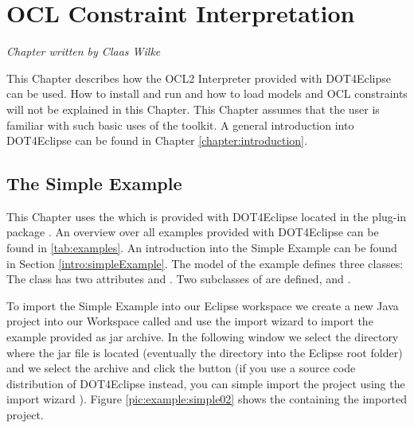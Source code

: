 \chapter{OCL Constraint Interpretation}
\label{chapter:interpretation}

\begin{flushright}
\textit{Chapter written by Claas Wilke}
\end{flushright}

This Chapter describes how the \acs{OCL}2 Interpreter provided with \acl{DOT4Eclipse} can be used. How to install and run  and how to load models and OCL constraints will not be explained in this Chapter. This Chapter assumes that the user is familiar with such basic uses of the toolkit. A general introduction into \acl{DOT4Eclipse} can be found in Chapter \ref{chapter:introduction}.




\section{The Simple Example}

This Chapter uses the  which is provided with \acl{DOT4Eclipse} located in the plug-in package . An overview over all examples provided with \acl{DOT4Eclipse} can be found in \ref{tab:examples}. An introduction into the Simple Example can be found in Section \ref{intro:simpleExample}. The model of the example defines three classes: The class  has two attributes  and . Two subclasses of  are defined,  and .

To import the Simple Example into our Eclipse workspace we create a new Java project into our Workspace called  and use the import wizard  to import the example provided as jar archive. In the following window we select the directory where the jar file is located (eventually the  directory into the Eclipse root folder) and we select the archive  and click the  button (if you use a source code distribution of \acl{DOT4Eclipse} instead, you can simple import the project  using the import wizard ). Figure \ref{pic:example:simple02} shows the  containing the imported project.

